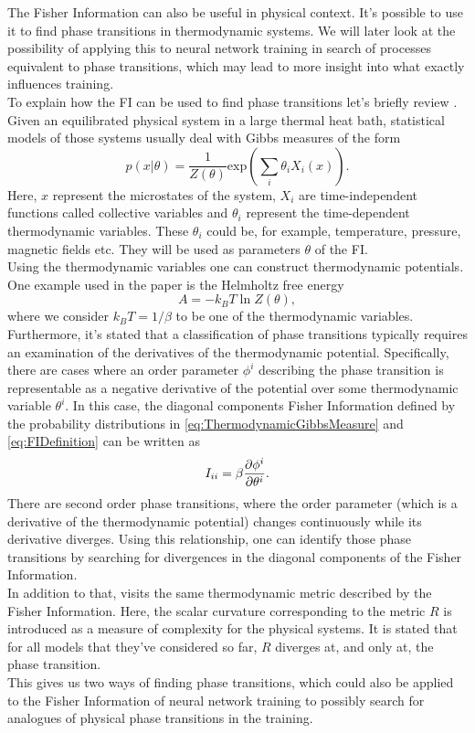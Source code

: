 The Fisher Information can also be useful in physical context. It's possible to use it to find phase transitions in thermodynamic systems. We will later look at the possibility of applying this to neural network training in search of processes equivalent to phase transitions, which may lead to more insight into what exactly influences training.\\
To explain how the FI can be used to find phase transitions let's briefly review \cite{Prokopenko}.\\
Given an equilibrated physical system in a large thermal heat bath, statistical models of those systems usually deal with Gibbs measures of the form 
\begin{equation}\label{eq:ThermodynamicGibbsMeasure}
	p(x|\theta) = \frac{1}{Z(\theta)} \mathrm{exp}\left(\sum_i \theta_i X_i(x)\right).
\end{equation}
Here, $x$ represent the microstates of the system, $X_i$ are time-independent functions called collective variables and $\theta_i$ represent the time-dependent thermodynamic variables. These $\theta_i$ could be, for example, temperature, pressure, magnetic fields etc. They will be used as parameters $\theta$ of the FI.\\
Using the thermodynamic variables one can construct thermodynamic potentials. One example used in the paper is the Helmholtz free energy 
\begin{equation}
	A = - k_B T \ln Z(\theta),
\end{equation}
where we consider $k_B T = 1/\beta$ to be one of the thermodynamic variables. \\
Furthermore, it's stated that a classification of phase transitions typically requires an examination of the derivatives of the thermodynamic potential. Specifically, there are cases where an order parameter $\phi^i$ describing the phase transition is representable as a negative derivative of the potential over some thermodynamic variable $\theta^i$. In this case, the diagonal components Fisher Information defined by the probability distributions in \cref{eq:ThermodynamicGibbsMeasure} and \cref{eq:FIDefinition} can be written as
\begin{equation}
	I_{ii} = \beta \frac{\partial\phi^i}{\partial\theta^i}.
\end{equation}
There are second order phase transitions, where the order parameter (which is a derivative of the thermodynamic potential) changes continuously while its derivative diverges. Using this relationship, one can identify those phase transitions by searching for divergences in the diagonal components of the Fisher Information.\\
In addition to that, \cite{Janke} visits the same thermodynamic metric described by the Fisher Information. Here, the scalar curvature corresponding to the metric $R$ is introduced as a measure of complexity for the physical systems. It is stated that for all models that they've considered so far, $R$ diverges at, and only at, the phase transition.\\
This gives us two ways of finding phase transitions, which could also be applied to the Fisher Information of neural network training to possibly search for analogues of physical phase transitions in the training.